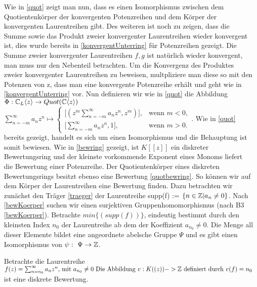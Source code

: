 {Wie in \ref{quot} zeigt man nun, dass es einen Isomorphismus zwischen dem Quotientenkörper der konvergenten Potenzreihen und dem Körper der konvergenten Laurentreihen gibt. Des weiteren ist noch zu zeigen, dass die Summe sowie das Produkt zweier konvergenter Laurentreihen wieder konvergent ist, dies wurde bereits in \ref{konvergentUnterring} für Potenzreihen gezeigt. Die Summe zweier konvergenter Laurentreihen $f,g $ ist natürlich wieder konvergent, man muss nur den Nebenteil betrachten. Um die Konvergenz des Produktes zweier konvergenter Laurentreihen zu beweisen, multpliziere man diese so mit den Potenzen von z, dass man eine konvergente Potenzreihe erhält und geht wie in \ref{konvergentUnterring} vor.
Nun definieren wir wie in \ref{quot} die Abbildung $\Phi:\mathbb{C}_L\langle z \rangle \rightarrow Quot(\mathbb{C} \langle z \rangle ) $
$ \sum_{n= -m}^{\infty} a_n z^n \mapsto  \begin{cases}
  \lbrack \left( z^{m} \sum_{n= -m}^{\infty}a_n z^n , z^m \right)\rbrack,  & \text{wenn }m < 0,\\
  \lbrack \sum_{n= -m}^{\infty} a_n z^n, 1 \rbrack, & \text{wenn } m > 0.
\end{cases} $. Wie in \ref{quot} bereits gezeigt, handelt es sich um einen Isomorphismus und die Behauptung ist somit bewiesen. %
}
%
%
%
Wie in \ref{bewring} gezeigt, ist $K[[z]]$ ein diskreter Bewertungsring und der kleinste vorkommende Exponent eines Monoms liefert die Bewertung einer Potenzreihe. Der Quotientenkörper eines diskreten Bewertungsrings besitzt ebenso eine Bewertung \ref{quotbewring}. So können wir auf dem Körper der Laurentreihen eine Bewertung finden.
Dazu betrachten wir zunächst den Träger \ref{traeger} der Laurentreihe supp(f) := $\lbrace n \in \mathbb{Z} | a_n \neq 0 \rbrace$. Nach \ref{bewKoerper} suchen wir einen surjektiven Gruppenhomomorphismus (nach B3 \ref{bewKoerper}). Betrachte $min\{\left(supp(f)\right)\}$, eindeutig bestimmt durch den kleinsten Index $n_0$ der Laurentreihe ab dem der Koeffizient $a_{n_0} \neq 0 $. Die Menge all dieser Elemente bildet eine angeordnete abelsche Gruppe $\Psi $ und es gibt einen Isomorphismus von $\psi: \text{ }\Psi \rightarrow \mathbb{Z}$. \\
%
%
%
\begin{satz} \label{LaurentreiheBewertung}
Betrachte die Laurentreihe $ f(z)=\sum_{n = n_0}^{\infty}a_n z^n \text{, mit } a_{n_0} \neq 0 \text{ Die Abbildung } v:K((z))-> \mathbb{Z} \text{ definiert durch } v(f)=n_0$ ist eine diskrete Bewertung.
\end{satz}
